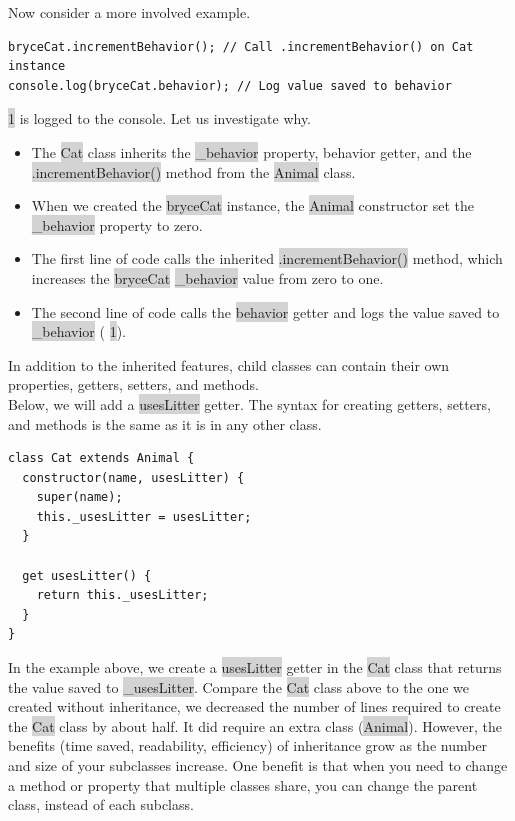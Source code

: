 \documentclass[11pt]{article}
\begin{document}
Now consider a more involved example.
\begin{lstlisting}
bryceCat.incrementBehavior(); // Call .incrementBehavior() on Cat instance 
console.log(bryceCat.behavior); // Log value saved to behavior
\end{lstlisting}
\colorbox{lightgray}{1} is logged to the console. Let us investigate why. 
\begin{itemize}[leftmargin = *]
\item The \colorbox{lightgray}{Cat} class inherits the \colorbox{lightgray}{\_behavior} property, behavior getter, and the \colorbox{lightgray}{.incrementBehavior()} method from the \colorbox{lightgray}{Animal} class.
\item When we created the \colorbox{lightgray}{bryceCat} instance, the  \colorbox{lightgray}{Animal} constructor set the  \colorbox{lightgray}{\_behavior} property to zero.
\item The first line of code calls the inherited  \colorbox{lightgray}{.incrementBehavior()} method, which increases the  \colorbox{lightgray}{bryceCat}  \colorbox{lightgray}{\_behavior} value from zero to one.
\item The second line of code calls the \colorbox{lightgray}{behavior} getter and logs the value saved to  \colorbox{lightgray}{\_behavior} ( \colorbox{lightgray}{1}).
\end{itemize}
In addition to the inherited features, child classes can contain their own properties, getters, setters, and methods. \\
\newline
Below, we will add a \colorbox{lightgray}{usesLitter} getter. The syntax for creating getters, setters, and methods is the same as it is in any other class.
\begin{lstlisting}
class Cat extends Animal {
  constructor(name, usesLitter) {
    super(name);
    this._usesLitter = usesLitter;
  }

  get usesLitter() {
    return this._usesLitter;
  }
}
\end{lstlisting}
In the example above, we create a \colorbox{lightgray}{usesLitter} getter in the \colorbox{lightgray}{Cat} class that returns the value saved to \colorbox{lightgray}{\_usesLitter}.
Compare the \colorbox{lightgray}{Cat} class above to the one we created without inheritance, we decreased the number of lines required to create the \colorbox{lightgray}{Cat} class by about half. It did require an extra class (\colorbox{lightgray}{Animal}). However, the benefits (time saved, readability, efficiency) of inheritance grow as the number and size of your subclasses increase. One benefit is that when you need to change a method or property that multiple classes share, you can change the parent class, instead of each subclass. \\
\end{document}
